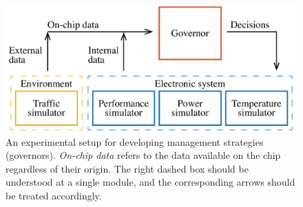 \begin{figure}
  \centering
  \includegraphics[width=1.0\columnwidth]{include/assets/figures/development.pdf}

  \caption{An experimental setup for developing management strategies
  (governors). \emph{On-chip data} refers to the data available on the chip
  regardless of their origin. The right dashed box should be understood at a
  single module, and the corresponding arrows should be treated accordingly.}

\end{figure}
